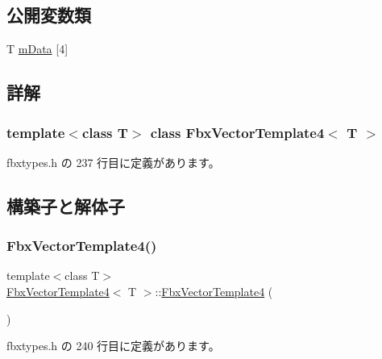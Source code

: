 \subsection*{公開変数類}
\begin{DoxyCompactItemize}
\item 
T \hyperlink{class_fbx_vector_template4_a8876bb35672f5ce31c297654122dace5}{m\+Data} \mbox{[}4\mbox{]}
\end{DoxyCompactItemize}


\subsection{詳解}
\subsubsection*{template$<$class T$>$\newline
class Fbx\+Vector\+Template4$<$ T $>$}



 fbxtypes.\+h の 237 行目に定義があります。



\subsection{構築子と解体子}
\mbox{\label{class_fbx_vector_template4_a9ee2843b8c3a3755cc26392513172469}} 
\subsubsection{\texorpdfstring{Fbx\+Vector\+Template4()}{FbxVectorTemplate4()}\hspace{0.1cm}{\footnotesize\ttfamily [1/3]}}
{\footnotesize\ttfamily template$<$class T$>$ \\
\hyperlink{class_fbx_vector_template4}{Fbx\+Vector\+Template4}$<$ T $>$\+::\hyperlink{class_fbx_vector_template4}{Fbx\+Vector\+Template4} (\begin{DoxyParamCaption}{ }\end{DoxyParamCaption})\hspace{0.3cm}{\ttfamily [inline]}}



 fbxtypes.\+h の 240 行目に定義があります。

